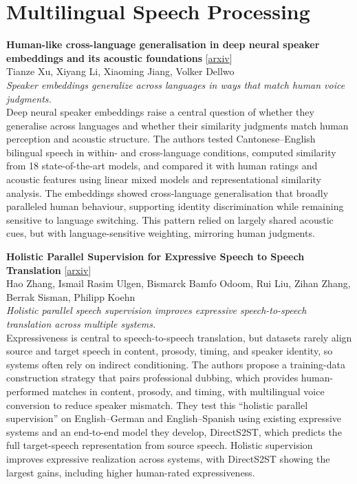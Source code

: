\documentclass[12pt,letterpaper]{article}
\begin{document}
\medskip
\section*{Multilingual Speech Processing}
\begin{minipage}{\linewidth}
{\small\textbf{Human-like cross-language generalisation in deep neural speaker embeddings and its acoustic foundations}} {\scriptsize[\href{https://arxiv.org/abs/2611.05384}{arxiv}]}\\
{\scriptsize Tianze Xu, Xiyang Li, Xiaoming Jiang, Volker Dellwo}\\
{\footnotesize\textit{Speaker embeddings generalize across languages in ways that match human voice judgments.}}\\[2pt]
{\footnotesize Deep neural speaker embeddings raise a central question of whether they generalise across languages and whether their similarity judgments match human perception and acoustic structure. The authors tested Cantonese--English bilingual speech in within- and cross-language conditions, computed similarity from 18 state-of-the-art models, and compared it with human ratings and acoustic features using linear mixed models and representational similarity analysis. The embeddings showed cross-language generalisation that broadly paralleled human behaviour, supporting identity discrimination while remaining sensitive to language switching. This pattern relied on largely shared acoustic cues, but with language-sensitive weighting, mirroring human judgments.}
\end{minipage}

\medskip
\begin{minipage}{\linewidth}
{\small\textbf{Holistic Parallel Supervision for Expressive Speech to Speech Translation}} {\scriptsize[\href{https://arxiv.org/abs/2611.06010}{arxiv}]}\\
{\scriptsize Hao Zhang, Ismail Rasim Ulgen, Bismarck Bamfo Odoom, Rui Liu, Zihan Zhang, Berrak Sisman, Philipp Koehn}\\
{\footnotesize\textit{Holistic parallel speech supervision improves expressive speech-to-speech translation across multiple systems.}}\\[2pt]
{\footnotesize Expressiveness is central to speech-to-speech translation, but datasets rarely align source and target speech in content, prosody, timing, and speaker identity, so systems often rely on indirect conditioning. The authors propose a training-data construction strategy that pairs professional dubbing, which provides human-performed matches in content, prosody, and timing, with multilingual voice conversion to reduce speaker mismatch. They test this ``holistic parallel supervision'' on English--German and English--Spanish using existing expressive systems and an end-to-end model they develop, DirectS2ST, which predicts the full target-speech representation from source speech. Holistic supervision improves expressive realization across systems, with DirectS2ST showing the largest gains, including higher human-rated expressiveness.}
\end{minipage}
\end{document}

